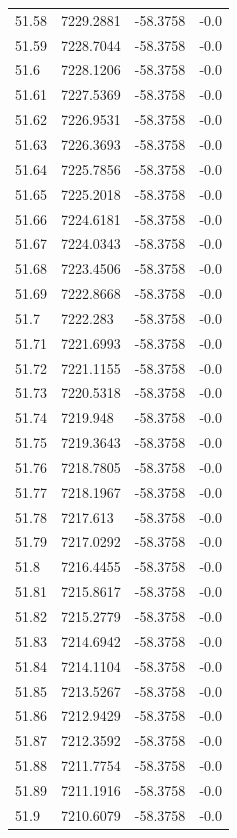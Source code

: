 \begin{table}[H]
\begin{tabular}{llll}
51.58 & 7229.2881 & -58.3758 & -0.0 \\
51.59 & 7228.7044 & -58.3758 & -0.0 \\
51.6 & 7228.1206 & -58.3758 & -0.0 \\
51.61 & 7227.5369 & -58.3758 & -0.0 \\
51.62 & 7226.9531 & -58.3758 & -0.0 \\
51.63 & 7226.3693 & -58.3758 & -0.0 \\
51.64 & 7225.7856 & -58.3758 & -0.0 \\
51.65 & 7225.2018 & -58.3758 & -0.0 \\
51.66 & 7224.6181 & -58.3758 & -0.0 \\
51.67 & 7224.0343 & -58.3758 & -0.0 \\
51.68 & 7223.4506 & -58.3758 & -0.0 \\
51.69 & 7222.8668 & -58.3758 & -0.0 \\
51.7 & 7222.283 & -58.3758 & -0.0 \\
51.71 & 7221.6993 & -58.3758 & -0.0 \\
51.72 & 7221.1155 & -58.3758 & -0.0 \\
51.73 & 7220.5318 & -58.3758 & -0.0 \\
51.74 & 7219.948 & -58.3758 & -0.0 \\
51.75 & 7219.3643 & -58.3758 & -0.0 \\
51.76 & 7218.7805 & -58.3758 & -0.0 \\
51.77 & 7218.1967 & -58.3758 & -0.0 \\
51.78 & 7217.613 & -58.3758 & -0.0 \\
51.79 & 7217.0292 & -58.3758 & -0.0 \\
51.8 & 7216.4455 & -58.3758 & -0.0 \\
51.81 & 7215.8617 & -58.3758 & -0.0 \\
51.82 & 7215.2779 & -58.3758 & -0.0 \\
51.83 & 7214.6942 & -58.3758 & -0.0 \\
51.84 & 7214.1104 & -58.3758 & -0.0 \\
51.85 & 7213.5267 & -58.3758 & -0.0 \\
51.86 & 7212.9429 & -58.3758 & -0.0 \\
51.87 & 7212.3592 & -58.3758 & -0.0 \\
51.88 & 7211.7754 & -58.3758 & -0.0 \\
51.89 & 7211.1916 & -58.3758 & -0.0 \\
51.9 & 7210.6079 & -58.3758 & -0.0 \\

\end{tabular}
\end{table}
